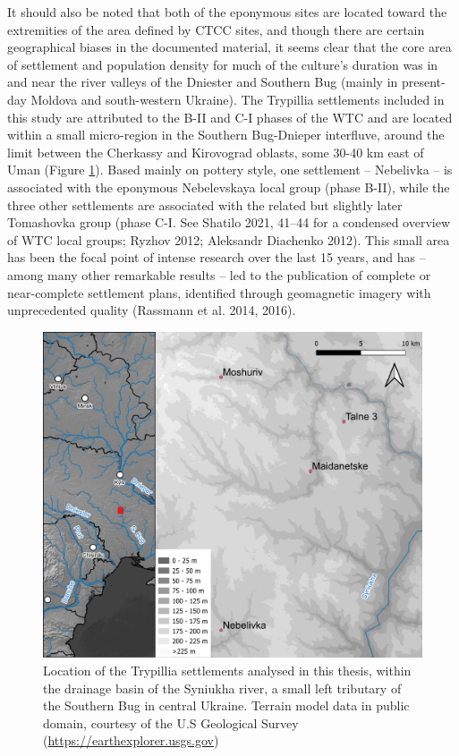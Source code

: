 \documentclass[
  12pt,
  a4paper, twoside]{book}
\begin{document}
It should also be noted that both of the eponymous sites are located toward the extremities of the area defined by CTCC sites, and though there are certain geographical biases in the documented material, it seems clear that the core area of settlement and population density for much of the culture's duration was in and near the river valleys of the Dniester and Southern Bug (mainly in present-day Moldova and south-western Ukraine). The Trypillia settlements included in this study are attributed to the B-II and C-I phases of the WTC and are located within a small micro-region in the Southern Bug-Dnieper interfluve, around the limit between the Cherkassy and Kirovograd oblasts, some 30-40 km east of Uman (Figure \ref{fig:03-trypillia}). Based mainly on pottery style, one settlement -- Nebelivka -- is associated with the eponymous Nebelevskaya local group (phase B-II), while the three other settlements are associated with the related but slightly later Tomashovka group (phase C-I. See Shatilo 2021, 41--44 for a condensed overview of WTC local groups; Ryzhov 2012; Aleksandr Diachenko 2012). This small area has been the focal point of intense research over the last 15 years, and has -- among many other remarkable results -- led to the publication of complete or near-complete settlement plans, identified through geomagnetic imagery with unprecedented quality (Rassmann et al. 2014, 2016).



\begin{figure}

{\centering \includegraphics[width=0.9\linewidth]{Results/fig03_trypillia} 

}

\caption[Map with location of Trypillia sites]{Location of the Trypillia settlements analysed in this thesis, within the drainage basin of the Syniukha river, a small left tributary of the Southern Bug in central Ukraine. Terrain model data in public domain, courtesy of the U.S Geological Survey (\url{https://earthexplorer.usgs.gov})}\label{fig:03-trypillia}
\end{figure}
\end{document}
